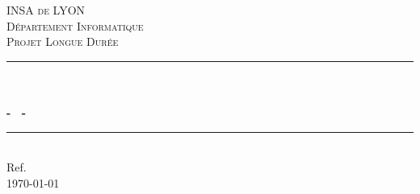 \begin{titlepage}

\newcommand{\HRule}{\rule{\linewidth}{0.5mm}} %

\center %
 

\vspace*{1cm}

\textsc{\LARGE INSA de LYON}\\[1.5cm] 
\textsc{\Large D\'epartement Informatique}\\[0.5cm] 
\textsc{\large Projet Longue Durée}\\[0.5cm] %


\HRule \\[0.4cm]
{ \huge \bfseries \mainTitle}\\[0.1cm]
{\large \bfseries - \secondTitle~-} 
\HRule \\[1.5cm]


{Ref. \documentRef}\\[0.5cm] %


{\large \today}\\[2cm] %
 


\end{titlepage}
